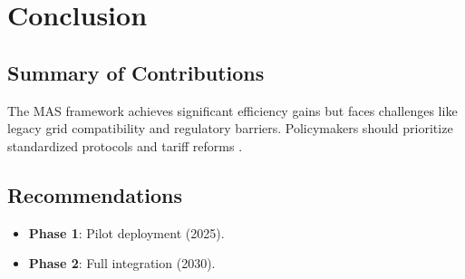 \documentclass[12pt]{report}
\begin{document}
\chapter{Conclusion}
\thispagestyle{empty}
\section{Summary of Contributions}
\begin{doublespace}
The MAS framework achieves significant efficiency gains but faces challenges like legacy grid compatibility and regulatory barriers. Policymakers should prioritize standardized protocols and tariff reforms \cite{MNRE2023}.
\end{doublespace}

\section{Recommendations}
\begin{doublespace}
\begin{itemize}
    \item \textbf{Phase 1}: Pilot deployment (2025).
    \item \textbf{Phase 2}: Full integration (2030).
\end{itemize}
\end{doublespace}

\end{document}
